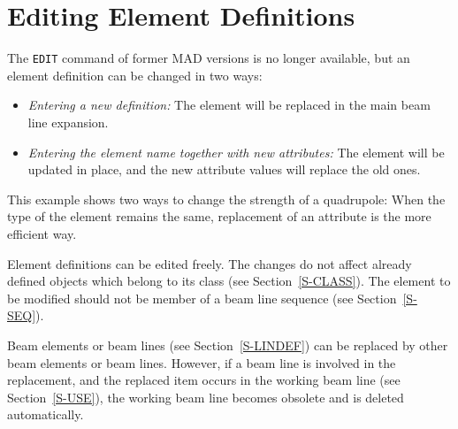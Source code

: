 \section{Editing Element Definitions}
\label{S-EDIT}
The {\tt EDIT} command of former MAD versions is no longer available,
but an element definition can be changed in two ways:
\begin{itemize}
\item {\em Entering a new definition:}
The element will be replaced in the main beam line expansion.
\item {\em Entering the element name together with new attributes:}
The element will be updated in place,
and the new attribute values will replace the old ones.
\end{itemize}
This example shows two ways to change the strength of a quadrupole:
When the type of the element remains the same,
replacement of an attribute is the more efficient way.
 
Element definitions can be edited freely.
The changes do not affect already defined objects which belong to
its class (see Section~\ref{S-CLASS}).
The element to be modified should not be member of a beam line
sequence (see Section~\ref{S-SEQ}).
 
Beam elements or beam lines (see Section~\ref{S-LINDEF})
can be replaced by other beam elements or beam lines.
However, if a beam line is involved in the replacement, and the replaced
item occurs in the working beam line (see Section~\ref{S-USE}),
the working beam line becomes obsolete and is deleted automatically.
\pagebreak[1]
 
